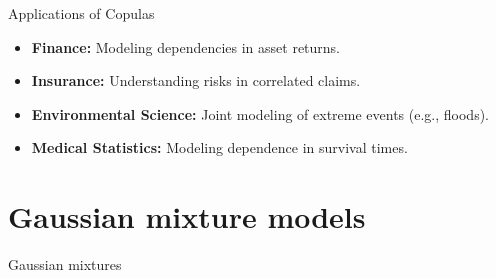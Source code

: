 \documentclass[11pt,handout,aspectratio=169]{beamer}
\begin{document}
\begin{frame}{Applications of Copulas}
\begin{itemize}
    \item \textbf{Finance:} Modeling dependencies in asset returns.
    \item \textbf{Insurance:} Understanding risks in correlated claims.
    \item \textbf{Environmental Science:} Joint modeling of extreme events (e.g., floods).
    \item \textbf{Medical Statistics:} Modeling dependence in survival times.
\end{itemize}
\end{frame}


\section{Gaussian mixture models}

\begin{frame}{}
	\begin{center}
		{\Huge \alert{Gaussian mixtures}}
	\end{center}
\end{frame}
\end{document}
